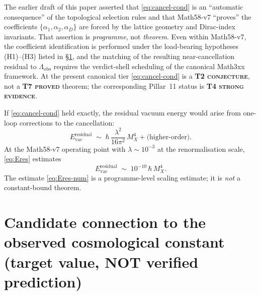 \begin{remark}\label{rmk:cancel-not-theorem}
The earlier draft of this paper asserted that
\eqref{eq:cancel-cond} is an ``automatic consequence'' of the
topological selection rules and that Math58-v7 ``proves'' the
coefficients $\{\alpha_1,\alpha_2,\alpha_D\}$ are forced by the
lattice geometry and Dirac-index invariants. That assertion is
\emph{programme}, not \emph{theorem}. Even within Math58-v7, the
coefficient identification is performed under the load-bearing
hypotheses (H1)--(H3) listed in \S\ref{sec:hypotheses-H}, and the
matching of the resulting near-cancellation residual to
$\Lambda_{\mathrm{obs}}$ requires the verdict-shell scheduling of
the canonical Math3xx framework. At the present canonical tier
\eqref{eq:cancel-cond} is a \textbf{T2 \textsc{conjecture}}, not a
\textbf{T7 \textsc{proved}} theorem; the corresponding Pillar~11
status is \textbf{T4 \textsc{strong evidence}}.
\end{remark}

If \eqref{eq:cancel-cond} held exactly, the residual vacuum energy
would arise from one-loop corrections to the cancellation:
\begin{equation}\label{eq:Eres}
  E_{\mathrm{vac}}^{\mathrm{residual}}
  \;\sim\; \hbar\,\frac{\lambda^2}{16\pi^2}\,M_X^4
  + \text{(higher-order)}.
\end{equation}
At the Math58-v7 operating point with $\lambda \sim 10^{-3}$ at the
renormalisation scale, \eqref{eq:Eres} estimates
\begin{equation}\label{eq:Eres-num}
  E_{\mathrm{vac}}^{\mathrm{residual}}
  \;\sim\; 10^{-10}\,\hbar\,M_X^4.
\end{equation}
The estimate \eqref{eq:Eres-num} is a programme-level scaling
estimate; it is \emph{not} a constant-bound theorem.

\section{Candidate connection to the observed cosmological constant
(target value, NOT verified prediction)}\label{sec:hypotheses-H}

